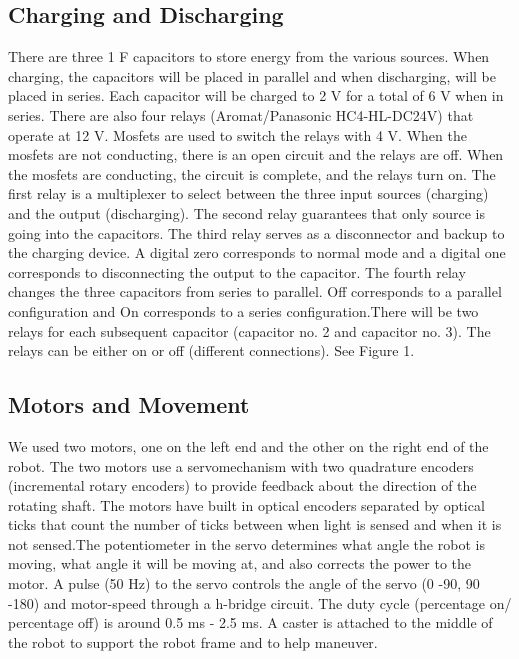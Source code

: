 \documentclass[12pt]{article}
\begin{document}
\subsection{Charging and Discharging} There are three 1 F capacitors to store energy from the various sources. When charging, the capacitors will be placed in parallel and when discharging, will be placed in series. Each capacitor will be charged to 2 V for a total of 6 V when in series. There are also four relays (Aromat/Panasonic HC4-HL-DC24V)  that operate at 12 V. Mosfets are used to switch the relays with 4 V. When the mosfets are not conducting, there is an open circuit and the relays are off. When the mosfets are conducting, the circuit is complete, and the relays turn on. The first relay is a multiplexer to select between the three input sources (charging) and the output (discharging). The second relay guarantees that only source is going into the capacitors. The third relay serves as a disconnector and backup to the charging device. A digital zero corresponds to normal mode and a digital one corresponds to disconnecting the output to the capacitor. The fourth relay changes the three capacitors from series to parallel. Off corresponds to a parallel configuration and On corresponds to a series configuration.There will be two relays for each subsequent capacitor (capacitor no. 2 and capacitor no. 3). The relays can be either on or off (different connections). See Figure 1.  





\subsection{Motors and Movement}
We used two motors, one on the left end and the other on the right end of the robot. The two motors use a servomechanism with two quadrature encoders (incremental rotary encoders) to provide feedback about the direction of the rotating shaft. The motors have built in optical encoders separated by optical ticks that count the number of ticks between when light is sensed and when it is not sensed.The potentiometer in the servo determines what angle the robot is moving, what angle it will be moving at, and also corrects the power to the motor. A pulse (50 Hz) to the servo controls the angle of the servo (0 -90, 90 -180) and motor-speed through a h-bridge circuit. The duty cycle (percentage on/ percentage off) is around 0.5 ms - 2.5 ms. A caster is attached to the middle of the robot to support the robot frame and to help maneuver. 
\end{document}
